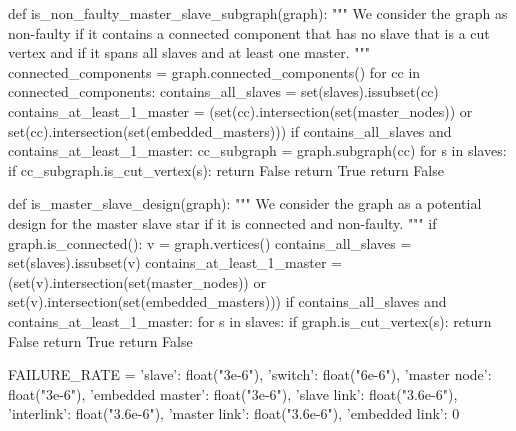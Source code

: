 \documentclass[times,a4paper,10pt,twocolumn]{article}
\theoremstyle{definition}
\theoremstyle{definition}
\theoremstyle{plain}
\begin{document}
\begin{sagesilent}

def is_non_faulty_master_slave_subgraph(graph):
    """
    We consider the graph as non-faulty if it contains a connected component
    that has no slave that is a cut vertex and if it spans all slaves and at
    least one master.
    """
    connected_components = graph.connected_components()
    for cc in connected_components:
        contains_all_slaves = set(slaves).issubset(cc)
        contains_at_least_1_master = (set(cc).intersection(set(master_nodes)) or
            set(cc).intersection(set(embedded_masters)))
        if contains_all_slaves and contains_at_least_1_master:
            cc_subgraph = graph.subgraph(cc)
            for s in slaves:
                if cc_subgraph.is_cut_vertex(s):
                    return False
            return True
    return False

def is_master_slave_design(graph):
    """
    We consider the graph as a potential design for the master slave star if
    it is connected and non-faulty.
    """
    if graph.is_connected():
        v = graph.vertices()
        contains_all_slaves = set(slaves).issubset(v)
        contains_at_least_1_master = (set(v).intersection(set(master_nodes)) or
            set(v).intersection(set(embedded_masters)))
        if contains_all_slaves and contains_at_least_1_master:
            for s in slaves:
                if graph.is_cut_vertex(s):
                    return False
            return True
    return False

FAILURE_RATE = {
    'slave': float("3e-6"),
    'switch': float("6e-6"),
    'master node': float("3e-6"),
    'embedded master': float("3e-6"),
    'slave link': float("3.6e-6"),
    'interlink': float("3.6e-6"),
    'master link': float("3.6e-6"),
    'embedded link': 0
}

\end{sagesilent}


\end{document}
